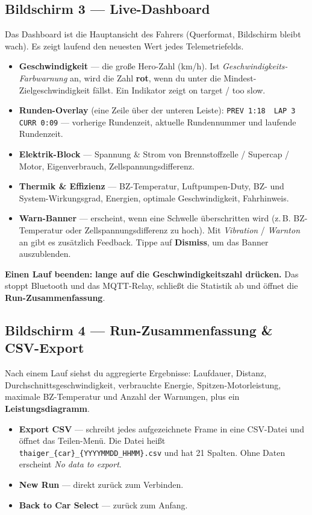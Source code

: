 \documentclass[11pt,a4paper,oneside]{report}
\newcommand{\midsep}{\,\textperiodcentered\,}
\newcommand{\ok}{\textcolor{tgreen}{\ding{51}}}
\newcommand{\nope}{\textcolor{tred}{\ding{55}}}
\newcommand{\code}[1]{\texttt{#1}}
\begin{document}
\subsection{Bildschirm 3 --- Live-Dashboard}
Das Dashboard ist die Hauptansicht des Fahrers (Querformat, Bildschirm bleibt
wach). Es zeigt laufend den neuesten Wert jedes Telemetriefelds.
\begin{itemize}
  \item \textbf{Geschwindigkeit} --- die gro\ss{}e Hero-Zahl (km/h). Ist
    \emph{Geschwindigkeits-Farbwarnung} an, wird die Zahl \textbf{rot}, wenn du
    unter die Mindest-Zielgeschwindigkeit f\"allst. Ein Indikator zeigt \ok{} on
    target / \nope{} too slow.
  \item \textbf{Runden-Overlay} (eine Zeile \"uber der unteren Leiste):
    \code{PREV 1:18} \midsep{} \code{LAP 3} \midsep{} \code{CURR 0:09} ---
    vorherige Rundenzeit, aktuelle Rundennummer und laufende Rundenzeit.
  \item \textbf{Elektrik-Block} --- Spannung \& Strom von Brennstoffzelle /
    Supercap / Motor, Eigenverbrauch, Zellspannungsdifferenz.
  \item \textbf{Thermik \& Effizienz} --- BZ-Temperatur, Luftpumpen-Duty, BZ- und
    System-Wirkungsgrad, Energien, optimale Geschwindigkeit, Fahrhinweis.
  \item \textbf{Warn-Banner} --- erscheint, wenn eine Schwelle \"uberschritten wird
    (z.\,B. BZ-Temperatur oder Zellspannungsdifferenz zu hoch). Mit
    \emph{Vibration} / \emph{Warnton} an gibt es zus\"atzlich Feedback. Tippe auf
    \textbf{Dismiss}, um das Banner auszublenden.
\end{itemize}
\begin{tgnote}
\textbf{Einen Lauf beenden:} \textbf{lange auf die Geschwindigkeitszahl
dr\"ucken.} Das stoppt Bluetooth und das MQTT-Relay, schlie\ss{}t die Statistik ab
und \"offnet die \textbf{Run-Zusammenfassung}.
\end{tgnote}

\subsection{Bildschirm 4 --- Run-Zusammenfassung \& CSV-Export}
Nach einem Lauf siehst du aggregierte Ergebnisse: Laufdauer, Distanz,
Durchschnittsgeschwindigkeit, verbrauchte Energie, Spitzen-Motorleistung, maximale
BZ-Temperatur und Anzahl der Warnungen, plus ein \textbf{Leistungsdiagramm}.
\begin{itemize}
  \item \textbf{Export CSV} --- schreibt jedes aufgezeichnete Frame in eine
    CSV-Datei und \"offnet das Teilen-Men\"u. Die Datei hei\ss{}t
    \code{thaiger\_\{car\}\_\allowbreak\{YYYYMMDD\_HHMM\}.csv} und hat 21 Spalten. Ohne Daten
    erscheint \emph{\glqq No data to export\grqq{}}.
  \item \textbf{New Run} --- direkt zur\"uck zum Verbinden.
  \item \textbf{Back to Car Select} --- zur\"uck zum Anfang.
\end{itemize}
\end{document}
